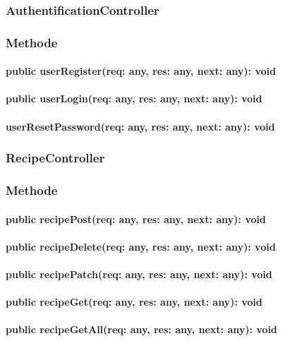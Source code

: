 \documentclass[parskip=full]{scrartcl}
\begin{document}
\subsubsection{AuthentificationController}
\subsubsection*{Methode}
\paragraph{public userRegister(req: any, res: any, next: any): void}
\paragraph{public userLogin(req: any, res: any, next: any): void}
\paragraph{userResetPassword(req: any, res: any, next: any): void}
\paragraph{}

\subsubsection{RecipeController}
\subsubsection*{Methode}
\paragraph{public recipePost(req: any, res: any, next: any): void}
\paragraph{public recipeDelete(req: any, res: any, next: any): void}
\paragraph{public recipePatch(req: any, res: any, next: any): void}
\paragraph{public recipeGet(req: any, res: any, next: any): void}
\paragraph{public recipeGetAll(req: any, res: any, next: any): void}
\end{document}
